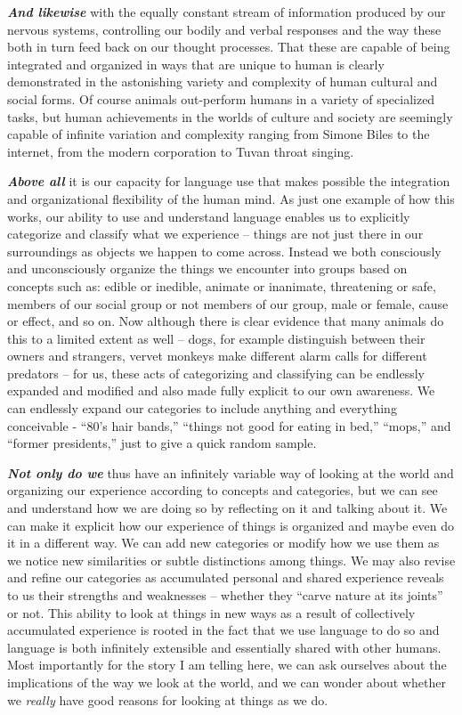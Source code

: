 \documentclass[]{book}
\begin{document}
\textbf{\emph{And likewise}} with the equally constant stream of information produced by our nervous systems, controlling our bodily and verbal responses and the way these both in turn feed back on our thought processes. That these are capable of being integrated and organized in ways that are unique to human is clearly demonstrated in the astonishing variety and complexity of human cultural and social forms. Of course animals out-perform humans in a variety of specialized tasks, but human achievements in the worlds of culture and society are seemingly capable of infinite variation and complexity ranging from Simone Biles to the internet, from the modern corporation to Tuvan throat singing.

\textbf{\emph{Above all}} it is our capacity for language use that makes possible the integration and organizational flexibility of the human mind. As just one example of how this works, our ability to use and understand language enables us to explicitly categorize and classify what we experience -- things are not just there in our surroundings as objects we happen to come across. Instead we both consciously and unconsciously organize the things we encounter into groups based on concepts such as: edible or inedible, animate or inanimate, threatening or safe, members of our social group or not members of our group, male or female, cause or effect, and so on. Now although there is clear evidence that many animals do this to a limited extent as well -- dogs, for example distinguish between their owners and strangers, vervet monkeys make different alarm calls for different predators -- for us, these acts of categorizing and classifying can be endlessly expanded and modified and also made fully explicit to our own awareness. We can endlessly expand our categories to include anything and everything conceivable - ``80's hair bands,'' ``things not good for eating in bed,'' ``mops,'' and ``former presidents,'' just to give a quick random sample.

\textbf{\emph{Not only do we}} thus have an infinitely variable way of looking at the world and organizing our experience according to concepts and categories, but we can see and understand how we are doing so by reflecting on it and talking about it. We can make it explicit how our experience of things is organized and maybe even do it in a different way. We can add new categories or modify how we use them as we notice new similarities or subtle distinctions among things. We may also revise and refine our categories as accumulated personal and shared experience reveals to us their strengths and weaknesses -- whether they ``carve nature at its joints'' or not. This ability to look at things in new ways as a result of collectively accumulated experience is rooted in the fact that we use language to do so and language is both infinitely extensible and essentially shared with other humans. Most importantly for the story I am telling here, we can ask ourselves about the implications of the way we look at the world, and we can wonder about whether we \emph{really} have good reasons for looking at things as we do.
\end{document}
